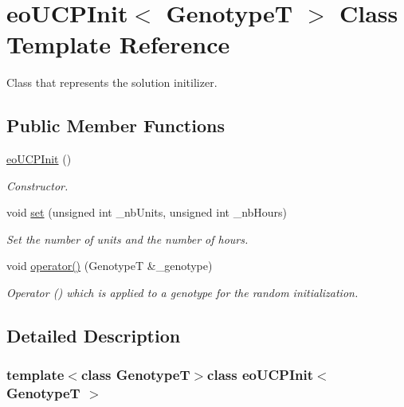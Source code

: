 \hypertarget{classeo_u_c_p_init}{\section{eo\-U\-C\-P\-Init$<$ \-Genotype\-T $>$ \-Class \-Template \-Reference}
\label{classeo_u_c_p_init}
}


\-Class that represents the solution initilizer.  


\subsection*{\-Public \-Member \-Functions}
\begin{DoxyCompactItemize}
\item 
\hyperlink{classeo_u_c_p_init_a1e1041bda45c15b66213d122642cf0d1}{eo\-U\-C\-P\-Init} ()
\begin{DoxyCompactList}\small\item\em \-Constructor. \end{DoxyCompactList}\item 
void \hyperlink{classeo_u_c_p_init_a0f512654f3c03a5b7a5824de939ac208}{set} (unsigned int \-\_\-nb\-Units, unsigned int \-\_\-nb\-Hours)
\begin{DoxyCompactList}\small\item\em \-Set the number of units and the number of hours. \end{DoxyCompactList}\item 
\hypertarget{classeo_u_c_p_init_a78252cb5a8feac7c75c5854a129fba0e}{void \hyperlink{classeo_u_c_p_init_a78252cb5a8feac7c75c5854a129fba0e}{operator()} (\-Genotype\-T \&\-\_\-genotype)}\label{classeo_u_c_p_init_a78252cb5a8feac7c75c5854a129fba0e}

\begin{DoxyCompactList}\small\item\em \-Operator () which is applied to a genotype for the random initialization. \end{DoxyCompactList}\end{DoxyCompactItemize}


\subsection{\-Detailed \-Description}
\subsubsection*{template$<$class \-Genotype\-T$>$class eo\-U\-C\-P\-Init$<$ Genotype\-T $>$}


